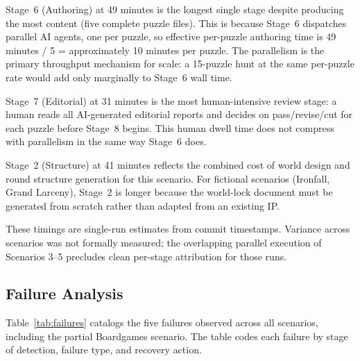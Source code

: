 Stage~6 (Authoring) at 49 minutes is the longest single stage despite producing the most content (five complete puzzle files). This is because Stage~6 dispatches parallel AI agents, one per puzzle, so effective per-puzzle authoring time is 49 minutes / 5 = approximately 10 minutes per puzzle. The parallelism is the primary throughput mechanism for scale: a 15-puzzle hunt at the same per-puzzle rate would add only marginally to Stage~6 wall time.

Stage~7 (Editorial) at 31 minutes is the most human-intensive review stage: a human reads all AI-generated editorial reports and decides on pass/revise/cut for each puzzle before Stage~8 begins. This human dwell time does not compress with parallelism in the same way Stage~6 does.

Stage~2 (Structure) at 41 minutes reflects the combined cost of world design and round structure generation for this scenario. For fictional scenarios (Ironfall, Grand Larceny), Stage~2 is longer because the world-lock document must be generated from scratch rather than adapted from an existing IP.

These timings are single-run estimates from commit timestamps. Variance across scenarios was not formally measured; the overlapping parallel execution of Scenarios 3--5 precludes clean per-stage attribution for those runs.

\subsection{Failure Analysis}
\label{sec:failures}

Table~\ref{tab:failures} catalogs the five failures observed across all scenarios, including the partial Boardgames scenario. The table codes each failure by stage of detection, failure type, and recovery action.

